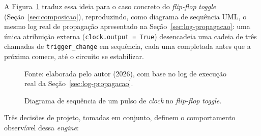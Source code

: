 A Figura~\ref{fig:diagrama-sequencia} traduz essa ideia para o caso concreto do \textit{flip-flop} \textit{toggle} (Seção~\ref{sec:composicao}), reproduzindo, como diagrama de sequência UML, o mesmo log real de propagação apresentado na Seção~\ref{sec:log-propagacao}: uma única atribuição externa (\texttt{clock.output = True}) desencadeia uma cadeia de três chamadas de \texttt{trigger\_change} em sequência, cada uma completada antes que a próxima comece, até o circuito se estabilizar.

\begin{figure}[H]
\centering
\caption{Diagrama de sequência de um pulso de \textit{clock} no \textit{flip-flop} \textit{toggle}.}
\label{fig:diagrama-sequencia}
\begin{center}
\footnotesize Fonte: elaborada pelo autor (2026), com base no log de execução real da Seção~\ref{sec:log-propagacao}.
\end{center}
\end{figure}

Três decisões de projeto, tomadas em conjunto, definem o comportamento observável dessa \textit{engine}:

